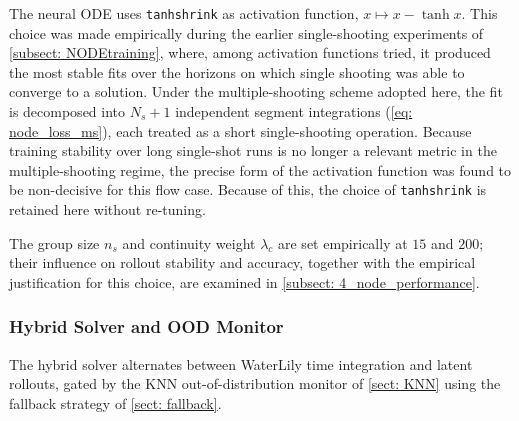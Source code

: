 The neural ODE uses \texttt{tanhshrink} as activation function, $x \mapsto x - \tanh x$. This choice was made empirically during the earlier single-shooting experiments of \autoref{subsect: NODEtraining}, where, among activation functions tried, it produced the most stable fits over the horizons on which single shooting was able to converge to a solution. Under the multiple-shooting scheme adopted here, the fit is decomposed into $N_s+1$ independent segment integrations (\autoref{eq: node_loss_ms}), each treated as a short single-shooting operation. Because training stability over long single-shot runs is no longer a relevant metric in the multiple-shooting regime, the precise form of the activation function was found to be non-decisive for this flow case. Because of this, the choice of \texttt{tanhshrink} is retained here without re-tuning. 

The group size $n_s$ and continuity weight $\lambda_c$ are set empirically at $15$ and $200$; their influence on rollout
stability and accuracy, together with the empirical justification for this choice, are examined in \autoref{subsect: 4_node_performance}.

\subsubsection{Hybrid Solver and OOD Monitor}
\label{subsubsect: 4_baseline_hybrid}

The hybrid solver alternates between WaterLily time integration and latent rollouts, gated by the KNN out-of-distribution monitor of \autoref{sect: KNN} using the fallback strategy of \autoref{sect: fallback}. 

